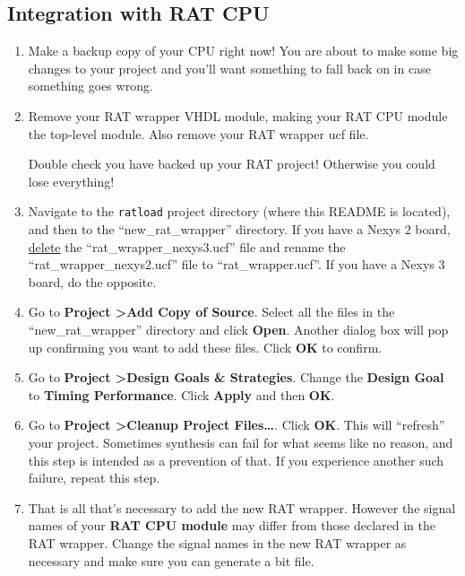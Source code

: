 \documentclass[notitlepage]{article}
\newcommand{\warningsign}{\fontencoding{U}\fontfamily{futs}\Large\selectfont\char 66\relax}
\begin{document}
\subsection{Integration with RAT CPU}

\begin {enumerate}

\item Make a backup copy of your CPU right now! You are about to make some big changes to your project and you'll want something to fall back on in case something goes wrong.

\item Remove your RAT wrapper VHDL module, making your RAT CPU module the top-level module. Also remove your RAT wrapper ucf file.

\begin{infobox}
  {\warningsign} Double check you have backed up your RAT project! Otherwise you could lose everything!
\end{infobox}

\item Navigate to the \texttt{ratload} project directory (where this README is located), and then to the ``new\_rat\_wrapper'' directory. If you have a Nexys 2 board, \underline{delete} the ``rat\_wrapper\_nexys3.ucf'' file and rename the ``rat\_wrapper\_nexys2.ucf'' file to ``rat\_wrapper.ucf''. If you have a Nexys 3 board, do the opposite.

\item Go to \textbf{Project \textgreater Add Copy of Source}. Select all the files in the ``new\_rat\_wrapper'' directory and click \textbf{Open}. Another dialog box will pop up confirming you want to add these files. Click \textbf{OK} to confirm.

\item Go to \textbf{Project \textgreater Design Goals \& Strategies}. Change the \textbf{Design Goal} to \textbf{Timing Performance}. Click \textbf{Apply} and then \textbf{OK}.

\item Go to \textbf{Project \textgreater Cleanup Project Files\ldots}. Click \textbf{OK}. This will ``refresh'' your project. Sometimes synthesis can fail for what seems like no reason, and this step is intended as a prevention of that. If you experience another such failure, repeat this step.

\item That is all that's necessary to add the new RAT wrapper. However the signal names of your \textbf{RAT CPU module} may differ from those declared in the RAT wrapper. Change the signal names in the new RAT wrapper as necessary and make sure you can generate a bit file.
\end{enumerate}
\end{document}
